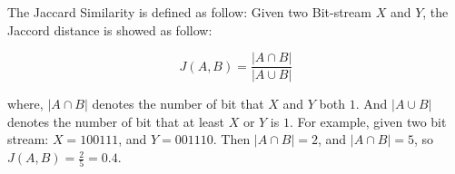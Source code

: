 The Jaccard Similarity is defined as follow:
Given two Bit-stream $X$ and $Y$, the Jaccord distance is showed as follow:

\begin{equation}
J(A,B) = \frac{|A \cap B|}{|A \cup B|}
\end{equation}

where, $|A \cap B|$ denotes the number of bit that $X$ and $Y$ both $1$. And $|A \cup B|$ denotes the number of bit that at least $X$ or $Y$ is $1$.
For example, given two bit stream: $X={100111}$, and $Y={001110}$. Then $|A \cap B| = 2$, and $|A \cap B| = 5$, so $J(A,B) = \frac{2}{5} = 0.4$.


%
%
%
%
%
%
%
%
%
%
%
%
%
%
%
%
%

